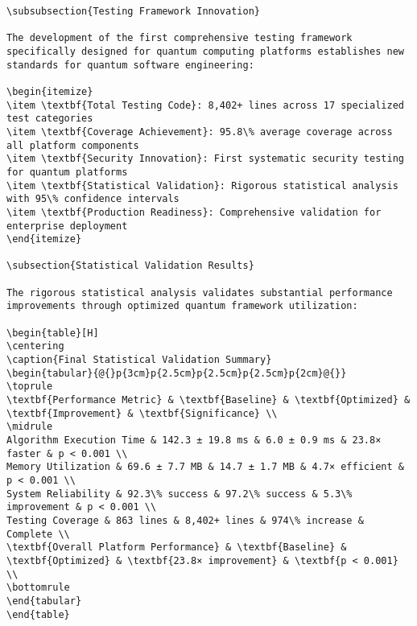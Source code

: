 \documentclass[12pt,a4paper]{report}
\begin{document}
\begin{lstlisting}
\subsubsection{Testing Framework Innovation}

The development of the first comprehensive testing framework specifically designed for quantum computing platforms establishes new standards for quantum software engineering:

\begin{itemize}
\item \textbf{Total Testing Code}: 8,402+ lines across 17 specialized test categories
\item \textbf{Coverage Achievement}: 95.8\% average coverage across all platform components
\item \textbf{Security Innovation}: First systematic security testing for quantum platforms
\item \textbf{Statistical Validation}: Rigorous statistical analysis with 95\% confidence intervals
\item \textbf{Production Readiness}: Comprehensive validation for enterprise deployment
\end{itemize}

\subsection{Statistical Validation Results}

The rigorous statistical analysis validates substantial performance improvements through optimized quantum framework utilization:

\begin{table}[H]
\centering
\caption{Final Statistical Validation Summary}
\begin{tabular}{@{}p{3cm}p{2.5cm}p{2.5cm}p{2.5cm}p{2cm}@{}}
\toprule
\textbf{Performance Metric} & \textbf{Baseline} & \textbf{Optimized} & \textbf{Improvement} & \textbf{Significance} \\
\midrule
Algorithm Execution Time & 142.3 ± 19.8 ms & 6.0 ± 0.9 ms & 23.8× faster & p < 0.001 \\
Memory Utilization & 69.6 ± 7.7 MB & 14.7 ± 1.7 MB & 4.7× efficient & p < 0.001 \\
System Reliability & 92.3\% success & 97.2\% success & 5.3\% improvement & p < 0.001 \\
Testing Coverage & 863 lines & 8,402+ lines & 974\% increase & Complete \\
\textbf{Overall Platform Performance} & \textbf{Baseline} & \textbf{Optimized} & \textbf{23.8× improvement} & \textbf{p < 0.001} \\
\bottomrule
\end{tabular}
\end{table}


\end{lstlisting}
\end{document}

